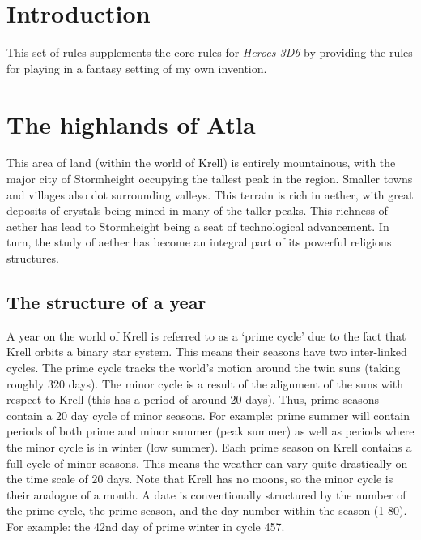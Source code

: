 \documentclass[a4paper,11pt,oneside]{book}
\newcommand{\textlf}[1]{\textbf{\titlecap{#1}}}
\begin{document}
%
\chapter{Introduction}
This set of rules supplements the core rules for \textit{Heroes 3D6} by providing the rules for playing in a fantasy setting of my own invention.


\chapter{The highlands of Atla}
This area of land (within the world of Krell) is entirely mountainous, with the major city of Stormheight occupying the tallest peak in the region. Smaller towns and villages also dot surrounding valleys. This terrain is rich in aether, with great deposits of crystals being mined in many of the taller peaks. This richness of aether has lead to Stormheight being a seat of technological advancement. In turn, the study of aether has become an integral part of its powerful religious structures.  

\section{The structure of a year}
A year on the world of Krell is referred to as a `prime cycle' due to the fact that Krell orbits a binary star system. This means their seasons have two inter-linked cycles. The prime cycle tracks the world's motion around the twin suns (taking roughly 320 days). The minor cycle is a result of the alignment of the suns with respect to Krell (this has a period of around 20 days). Thus, prime seasons contain a 20 day cycle of minor seasons. For example: prime summer will contain periods of both prime and minor summer (peak summer) as well as periods where the minor cycle is in winter (low summer). Each prime season on Krell contains a full cycle of minor seasons. This means the weather can vary quite drastically on the time scale of 20 days. Note that Krell has no moons, so the minor cycle is their analogue of a month. A date is conventionally structured by the number of the prime cycle, the prime season, and the day number within the season (1-80). For example: the 42nd day of prime winter in cycle 457.
\end{document}
